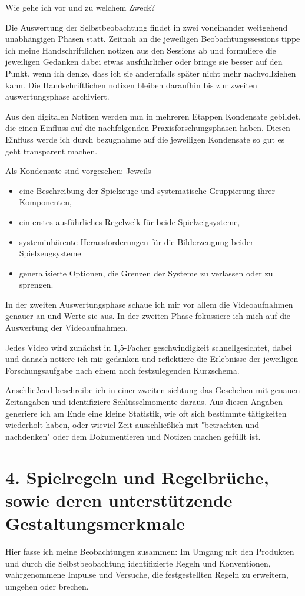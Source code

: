 \documentclass[11pt,a4paper,twoside]{scrreprt}
\begin{document}
Wie gehe ich vor und zu welchem Zweck?

Die Auswertung der Selbstbeobachtung findet in zwei voneinander weitgehend unabhängigen Phasen statt. Zeitnah an die jeweiligen Beobachtungssessions tippe ich meine Handschriftlichen notizen aus den Sessions ab und formuliere die jeweiligen Gedanken dabei etwas ausführlicher oder bringe sie besser auf den Punkt, wenn ich denke, dass ich sie andernfalls später nicht mehr nachvollziehen kann. Die Handschriftlichen notizen bleiben daraufhin bis zur zweiten auswertungsphase archiviert. 

Aus den digitalen Notizen werden nun in mehreren Etappen Kondensate gebildet, die einen Einfluss auf die nachfolgenden Praxisforschungsphasen haben. Diesen Einfluss werde ich durch bezugnahme auf die jeweiligen Kondensate so gut es geht transparent machen.


Als Kondensate sind vorgesehen: Jeweils 
\begin{itemize}
	\item eine Beschreibung der Spielzeuge und systematische Gruppierung ihrer Komponenten,
	\item ein erstes ausführliches Regelwelk für beide Spielzeigsysteme,
	\item systeminhärente Herausforderungen für die Bilderzeugung beider Spielzeugsysteme
	\item generalisierte Optionen, die Grenzen der Systeme zu verlassen oder zu sprengen.
\end{itemize}

In der zweiten Auswertungsphase schaue ich mir vor allem die Videoaufnahmen genauer an und Werte sie aus. In der zweiten Phase fokussiere ich mich auf die Auswertung der Videoaufnahmen.

Jedes Video wird zunächst in 1,5-Facher geschwindigkeit schnellgesichtet, dabei und danach notiere ich mir gedanken und reflektiere die Erlebnisse der jeweiligen Forschungsaufgabe nach einem noch festzulegenden Kurzschema.

Anschließend beschreibe ich in einer zweiten sichtung das Geschehen mit genauen Zeitangaben und identifiziere Schlüsselmomente daraus.
Aus diesen Angaben generiere ich am Ende eine kleine Statistik, wie oft sich bestimmte tätigkeiten wiederholt haben, oder wieviel Zeit ausschließlich mit "betrachten und nachdenken"  oder dem Dokumentieren und Notizen machen gefüllt ist.



\chapter{4. Spielregeln und Regelbrüche, sowie deren unterstützende Gestaltungsmerkmale}
Hier fasse ich meine Beobachtungen zusammen: Im Umgang mit den Produkten und durch die Selbstbeobachtung identifizierte Regeln und Konventionen, wahrgenommene Impulse und Versuche, die festgestellten Regeln zu erweitern, umgehen oder brechen.
\end{document}
